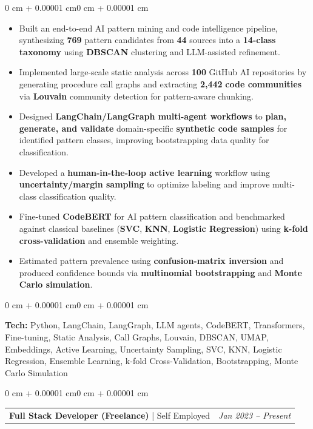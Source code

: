 \documentclass[10pt, letterpaper]{article}
\makeatletter
\newenvironment{highlights}{
    \begin{itemize}[
        topsep=0.10 cm,
        parsep=0.10 cm,
        partopsep=0pt,
        itemsep=0pt,
        leftmargin=0 cm + 10pt
    ]
}{
    \end{itemize}
}
\newenvironment{onecolentry}{
    \begin{adjustwidth}{0 cm + 0.00001 cm}{0 cm + 0.00001 cm}
}{
    \end{adjustwidth}
}
\newenvironment{twocolentry}{
    \begin{onecolentry}
    \begin{tabular}{@{}p{\dimexpr\textwidth-4.5cm\relax}>{\raggedleft\arraybackslash}p{4.5cm}@{}}
}{
    \end{tabular}
    \end{onecolentry}
}
\newcommand{\twocolitem}[2]{#1 & \textit{#2} \\}
\makeatother
\begin{document}
\vspace{0.08 cm}
\begin{onecolentry}
    \begin{highlights}
        \item Built an end-to-end AI pattern mining and code intelligence pipeline, synthesizing \textbf{769} pattern candidates from \textbf{44} sources into a \textbf{14-class taxonomy} using \textbf{DBSCAN} clustering and LLM-assisted refinement.
        \item Implemented large-scale static analysis across \textbf{100} GitHub AI repositories by generating procedure call graphs and extracting \textbf{2,442} \textbf{code communities} via \textbf{Louvain} community detection for pattern-aware chunking.
        \item Designed \textbf{LangChain/LangGraph multi-agent workflows} to \textbf{plan, generate, and validate} domain-specific \textbf{synthetic code samples} for identified pattern classes, improving bootstrapping data quality for classification.
        \item Developed a \textbf{human-in-the-loop active learning} workflow using \textbf{uncertainty/margin sampling} to optimize labeling and improve multi-class classification quality.
        \item Fine-tuned \textbf{CodeBERT} for AI pattern classification and benchmarked against classical baselines (\textbf{SVC}, \textbf{KNN}, \textbf{Logistic Regression}) using \textbf{k-fold cross-validation} and ensemble weighting.
        \item Estimated pattern prevalence using \textbf{confusion-matrix inversion} and produced confidence bounds via \textbf{multinomial bootstrapping} and \textbf{Monte Carlo simulation}.
    \end{highlights}
\end{onecolentry}

\vspace{0.08 cm}
\begin{onecolentry}
\textbf{Tech:} Python, LangChain, LangGraph, LLM agents, CodeBERT, Transformers, Fine-tuning, Static Analysis, Call Graphs, Louvain, DBSCAN, UMAP, Embeddings, Active Learning, Uncertainty Sampling, SVC, KNN, Logistic Regression, Ensemble Learning, k-fold Cross-Validation, Bootstrapping, Monte Carlo Simulation
\end{onecolentry}

\vspace{0.18 cm}

\begin{twocolentry}
\twocolitem{\textbf{Full Stack Developer (Freelance)} | Self Employed}{Jan 2023 -- Present}
\end{twocolentry}
\end{document}
